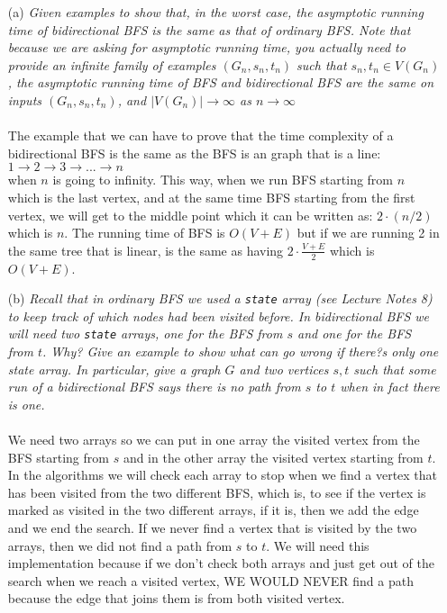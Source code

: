 \documentclass[12pt]{article} \setlength{\oddsidemargin}{0in}
\begin{document}
\begin{enumerate}
\item[(a)]{\textit{Given examples to show that, in the worst case, the asymptotic running time of
bidirectional BFS is the same as that of ordinary BFS. Note that because we are
asking for asymptotic running time, you actually need to provide an infinite family
of examples $(G_n , s_n , t_n )$ such that $s_n, t_n \in V(G_n)$, the asymptotic running time of
BFS and bidirectional BFS are the same on inputs $(G_n, s_n, t_n)$, and $|V(G_n)| \rightarrow \infty$ as $n \rightarrow \infty$}}
  \\\\
  The example that we can have to prove that the time complexity of a bidirectional BFS is the same as the BFS is an graph that is a line:\\
  $1 \rightarrow 2 \rightarrow  3 \rightarrow  ... \rightarrow n$ \\ when $n$ is going to infinity. This way, when we run BFS starting from $n$ which is the last vertex, and at the same time BFS starting from the first vertex, we will get to the middle point which it can be written as: $2\cdot(n/2)$ which is $n$. The running time of BFS is $O(V+E)$ but if we are running 2 in the same tree that is linear, is the same as having $2\cdot \frac{V+E}{2}$ which is $O(V+E)$. 
  \\
\item[(b)]{\textit{Recall that in ordinary BFS we used a \texttt{state} array (see Lecture Notes 8) to keep track of which nodes had been visited before. In bidirectional BFS we will need two
\texttt{state} arrays, one for the BFS from $s$ and one for the BFS from $t$. Why? Give an
example to show what can go wrong if there?s only one state array. In particular,
give a graph $G$ and two vertices $s, t$ such that some run of a bidirectional BFS
says there is no path from $s$ to $t$ when in fact there is one.}}
  \\\\
  We need two arrays so we can put in one array the visited vertex from the BFS starting from $s$ and in the other array the visited vertex starting from $t$. In the algorithms we will check each array to stop when we find a vertex that has been visited from the two different BFS, which is, to see if the vertex is marked as visited in the two different arrays, if it is, then we add the edge and we end the search. If we never find a vertex that is visited by the two arrays, then we did not find a path from $s$ to $t$. We will need this implementation because if we don't check both arrays and just get out of the search when we reach a visited vertex, WE WOULD NEVER find a path because the edge that joins them is from both visited vertex. 

\end{enumerate}
\end{document}
